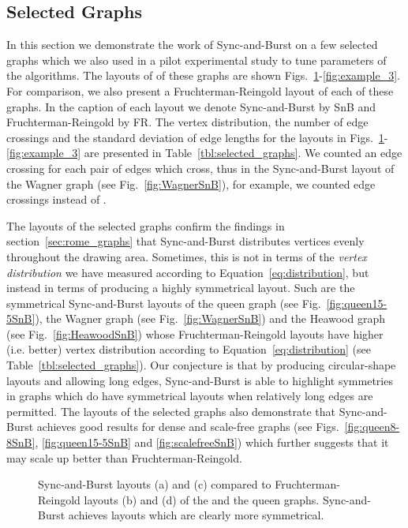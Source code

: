 \documentclass{llncs}
\begin{document}
\subsection{Selected Graphs}\label{sec:selected_graphs}

In this section we demonstrate the work of Sync-and-Burst on a few selected graphs which we also used in a pilot experimental study to tune parameters of the algorithms. The layouts of  of these graphs are shown Figs.~\ref{fig:example_1}-\ref{fig:example_3}. For comparison, we also present a Fruchterman-Reingold layout of each of these graphs. In the caption of each layout we denote Sync-and-Burst by SnB and Fruchterman-Reingold by FR. The vertex distribution, the number of edge crossings and the standard deviation of edge lengths for the layouts in Figs.~\ref{fig:example_1}-\ref{fig:example_3} are presented in Table~\ref{tbl:selected_graphs}. We counted an edge crossing for each pair of edges which cross, thus in the Sync-and-Burst layout of the Wagner graph (see Fig.~\ref{fig:WagnerSnB}), for example, we counted  edge crossings instead of .

The layouts of the selected graphs confirm the findings in section~\ref{sec:rome_graphs} that Sync-and-Burst distributes vertices evenly throughout the drawing area. Sometimes, this is not in terms of the \emph{vertex distribution} we have measured according to Equation~\eqref{eq:distribution}, but instead in terms of producing a highly symmetrical layout. Such are the symmetrical Sync-and-Burst layouts of the  queen graph (see Fig.~\ref{fig:queen15-5SnB}), the Wagner graph (see Fig.~\ref{fig:WagnerSnB}) and the Heawood graph (see Fig.~\ref{fig:HeawoodSnB}) whose Fruchterman-Reingold layouts have higher (i.e. better) vertex distribution according to Equation~\eqref{eq:distribution} (see Table~\ref{tbl:selected_graphs}). Our conjecture is that by producing circular-shape layouts and allowing long edges, Sync-and-Burst is able to highlight symmetries in graphs which do have symmetrical layouts when relatively long edges are permitted. The layouts of the selected graphs also demonstrate that Sync-and-Burst achieves good results for dense and scale-free graphs (see Figs.~\ref{fig:queen8-8SnB}, \ref{fig:queen15-5SnB} and \ref{fig:scalefreeSnB}) which further suggests that it may scale up better than Fruchterman-Reingold. 

\begin{figure}
\centering
{}
\caption{Sync-and-Burst layouts (a) and (c) compared to Fruchterman-Reingold layouts (b) and (d) of the  and the  queen graphs. Sync-and-Burst achieves layouts which are clearly more symmetrical.}
\label{fig:example_1}
\end{figure}
\end{document}
